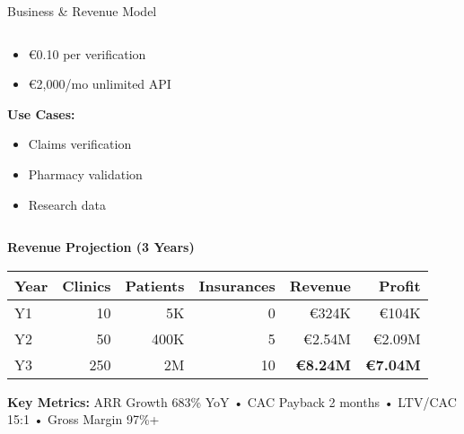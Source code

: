 \documentclass[aspectratio=169,xcolor=dvipsnames,20pt]{beamer}
\newcommand{\checkitem}{\item[\color{SuccessGreen}\faCheckCircle]}
\begin{document}
\begin{frame}{Business \& Revenue Model}
\begin{columns}[T]
\begin{column}{0.33\textwidth}
      \begin{itemize}
        \item €0.10 per verification
        \item €2,000/mo unlimited API
      \end{itemize}

      \vspace{0.2cm}

      \textbf{Use Cases:}
      \begin{itemize}
        \checkitem Claims verification
        \checkitem Pharmacy validation
        \checkitem Research data
      \end{itemize}
    \end{column}
  \end{columns}

  \vspace{0.4cm}

  \textbf{\textcolor{FadjmaBlue}{Revenue Projection (3 Years)}}

  \begin{table}
    \small
    \begin{tabular}{lrrrrr}
      \toprule
      \textbf{Year} & \textbf{Clinics} & \textbf{Patients} & \textbf{Insurances} & \textbf{Revenue} & \textbf{Profit} \\
      \midrule
      Y1 & 10 & 5K & 0 & €324K & €104K \\
      Y2 & 50 & 400K & 5 & €2.54M & €2.09M \\
      Y3 & 250 & 2M & 10 & \textcolor{SuccessGreen}{\textbf{€8.24M}} & \textcolor{SuccessGreen}{\textbf{€7.04M}} \\
      \bottomrule
    \end{tabular}
  \end{table}

  \textbf{Key Metrics:} ARR Growth 683\% YoY • CAC Payback 2 months • LTV/CAC 15:1 • \textcolor{SuccessGreen}{Gross Margin 97\%+}

\end{frame}
\end{document}
